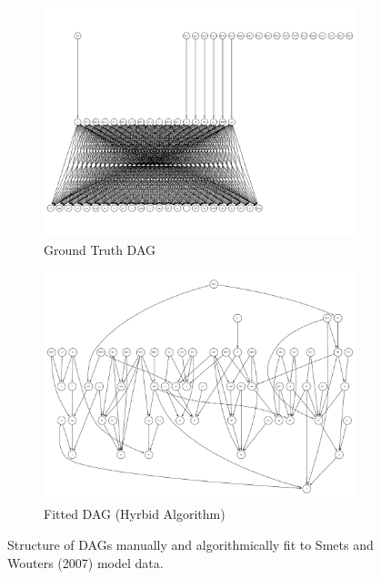 \documentclass{article}
\begin{document}
\begin{figure}

  \centering
  \begin{subfigure}{0.6\textwidth}
    \centering
    \includegraphics[width=\linewidth]{images/sw_gt_dag.png} 
    \caption{Ground Truth DAG}
    \label{sw_gtdag}
  \end{subfigure}
  \begin{subfigure}{0.6\textwidth}
    \centering  
    \includegraphics[width=\linewidth]{images/sw_hybrid_01_dag.png}
    \caption{Fitted DAG (Hyrbid Algorithm)}
    \label{sw_hdag}
  \end{subfigure}

  \caption{Structure of DAGs manually and algorithmically fit to Smets and Wouters (2007) model data.}
  \label{swdags}
\end{figure}
\end{document}

